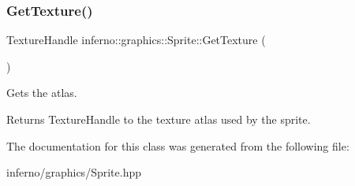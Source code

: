 \subsubsection{\texorpdfstring{Get\+Texture()}{GetTexture()}}
{\footnotesize\ttfamily Texture\+Handle inferno\+::graphics\+::\+Sprite\+::\+Get\+Texture (\begin{DoxyParamCaption}{ }\end{DoxyParamCaption})\hspace{0.3cm}{\ttfamily [inline]}}



Gets the atlas. 

\begin{DoxyReturn}{Returns}
Texture\+Handle to the texture atlas used by the sprite. 
\end{DoxyReturn}


The documentation for this class was generated from the following file\+:\begin{DoxyCompactItemize}
\item 
inferno/graphics/Sprite.\+hpp\end{DoxyCompactItemize}
